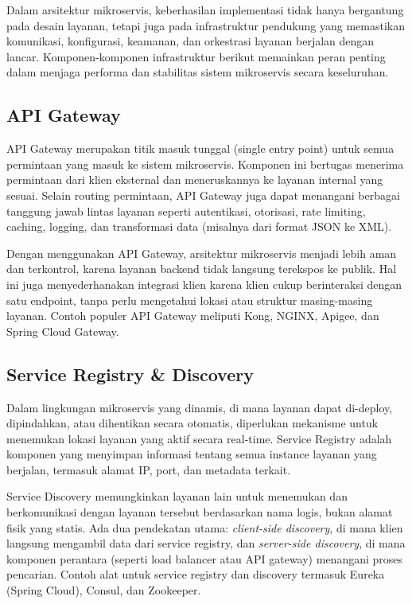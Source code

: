 Dalam arsitektur mikroservis, keberhasilan implementasi tidak hanya bergantung pada desain layanan, tetapi juga pada infrastruktur pendukung yang memastikan komunikasi, konfigurasi, keamanan, dan orkestrasi layanan berjalan dengan lancar. Komponen-komponen infrastruktur berikut memainkan peran penting dalam menjaga performa dan stabilitas sistem mikroservis secara keseluruhan.

\subsection{API Gateway}

API Gateway merupakan titik masuk tunggal (single entry point) untuk semua permintaan yang masuk ke sistem mikroservis. Komponen ini bertugas menerima permintaan dari klien eksternal dan meneruskannya ke layanan internal yang sesuai. Selain routing permintaan, API Gateway juga dapat menangani berbagai tanggung jawab lintas layanan seperti autentikasi, otorisasi, rate limiting, caching, logging, dan transformasi data (misalnya dari format JSON ke XML).

Dengan menggunakan API Gateway, arsitektur mikroservis menjadi lebih aman dan terkontrol, karena layanan backend tidak langsung terekspos ke publik. Hal ini juga menyederhanakan integrasi klien karena klien cukup berinteraksi dengan satu endpoint, tanpa perlu mengetahui lokasi atau struktur masing-masing layanan. Contoh populer API Gateway meliputi Kong, NGINX, Apigee, dan Spring Cloud Gateway.

\subsection{Service Registry \& Discovery}

Dalam lingkungan mikroservis yang dinamis, di mana layanan dapat di-deploy, dipindahkan, atau dihentikan secara otomatis, diperlukan mekanisme untuk menemukan lokasi layanan yang aktif secara real-time. Service Registry adalah komponen yang menyimpan informasi tentang semua instance layanan yang berjalan, termasuk alamat IP, port, dan metadata terkait.

Service Discovery memungkinkan layanan lain untuk menemukan dan berkomunikasi dengan layanan tersebut berdasarkan nama logis, bukan alamat fisik yang statis. Ada dua pendekatan utama: \textit{client-side discovery}, di mana klien langsung mengambil data dari service registry, dan \textit{server-side discovery}, di mana komponen perantara (seperti load balancer atau API gateway) menangani proses pencarian. Contoh alat untuk service registry dan discovery termasuk Eureka (Spring Cloud), Consul, dan Zookeeper.

